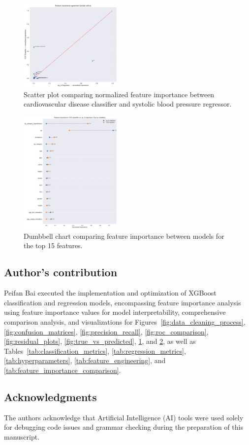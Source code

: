 \documentclass[conference]{IEEEtran}
\begin{document}
\begin{figure}[h]
    \centering
    \includegraphics[width=0.45\textwidth]{plots/model_importance_scatter.pdf}
    \caption{Scatter plot comparing normalized feature importance between cardiovascular disease classifier and systolic blood pressure regressor.}
    \label{fig:model_importance_scatter}
\end{figure}

\begin{figure}[h]
    \centering
    \includegraphics[width=0.45\textwidth]{plots/model_importance_dumbbell.pdf}
    \caption{Dumbbell chart comparing feature importance between models for the top 15 features.}
    \label{fig:model_importance_dumbbell}
\end{figure}

\subsection{Author's contribution}

Peifan Bai executed the implementation and optimization of XGBoost classification and regression models, encompassing feature importance analysis using feature importance values for model interpretability, comprehensive comparison analysis, and visualizations for Figures~\ref{fig:data_cleaning_process}, \ref{fig:confusion_matrices}, \ref{fig:precision_recall}, \ref{fig:roc_comparison}, \ref{fig:residual_plots}, \ref{fig:true_vs_predicted}, \ref{fig:model_importance_scatter}, and \ref{fig:model_importance_dumbbell}, as well as Tables~\ref{tab:classification_metrics}, \ref{tab:regression_metrics}, \ref{tab:hyperparameters}, \ref{tab:feature_engineering}, and \ref{tab:feature_importance_comparison}.

\subsection{Acknowledgments}

The authors acknowledge that Artificial Intelligence (AI) tools were used solely for debugging code issues and grammar checking during the preparation of this manuscript.
\end{document}
